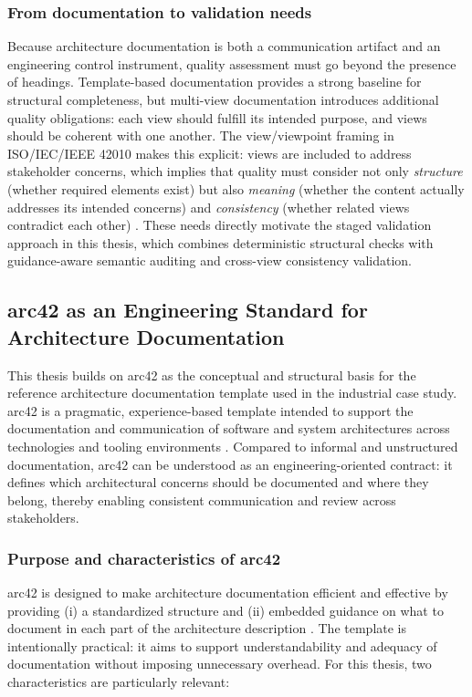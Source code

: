 \subsubsection{From documentation to validation needs}
Because architecture documentation is both a communication artifact and an engineering control instrument, quality assessment must go beyond the presence of headings. Template-based documentation provides a strong baseline for structural completeness, but multi-view documentation introduces additional quality obligations: each view should fulfill its intended purpose, and views should be coherent with one another. The view/viewpoint framing in ISO/IEC/IEEE 42010 makes this explicit: views are included to address stakeholder concerns, which implies that quality must consider not only \emph{structure} (whether required elements exist) but also \emph{meaning} (whether the content actually addresses its intended concerns) and \emph{consistency} (whether related views contradict each other) \cite{iso42010}. These needs directly motivate the staged validation approach in this thesis, which combines deterministic structural checks with guidance-aware semantic auditing and cross-view consistency validation.

\subsection{arc42 as an Engineering Standard for Architecture Documentation}
This thesis builds on arc42 as the conceptual and structural basis for the reference architecture documentation template used in the industrial case study. arc42 is a pragmatic, experience-based template intended to support the documentation and communication of software and system architectures across technologies and tooling environments \cite{arc42_overview}. Compared to informal and unstructured documentation, arc42 can be understood as an engineering-oriented contract: it defines which architectural concerns should be documented and where they belong, thereby enabling consistent communication and review across stakeholders.

\subsubsection{Purpose and characteristics of arc42}
arc42 is designed to make architecture documentation efficient and effective by providing (i) a standardized structure and (ii) embedded guidance on what to document in each part of the architecture description \cite{arc42_overview,arc42_template}. The template is intentionally practical: it aims to support understandability and adequacy of documentation without imposing unnecessary overhead. For this thesis, two characteristics are particularly relevant:

